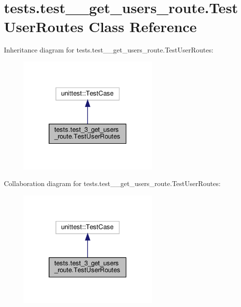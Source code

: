 \hypertarget{classtests_1_1test__3__get__users__route_1_1_test_user_routes}{}\section{tests.\+test\+\_\+\_\+get\+\_\+users\+\_\+route.\+Test\+User\+Routes Class Reference}
\label{classtests_1_1test__3__get__users__route_1_1_test_user_routes}


Inheritance diagram for tests.\+test\+\_\+\_\+get\+\_\+users\+\_\+route.\+Test\+User\+Routes\+:
\nopagebreak
\begin{figure}[H]
\begin{center}
\leavevmode
\includegraphics[width=199pt]{classtests_1_1test__3__get__users__route_1_1_test_user_routes__inherit__graph}
\end{center}
\end{figure}


Collaboration diagram for tests.\+test\+\_\+\_\+get\+\_\+users\+\_\+route.\+Test\+User\+Routes\+:
\nopagebreak
\begin{figure}[H]
\begin{center}
\leavevmode
\includegraphics[width=199pt]{classtests_1_1test__3__get__users__route_1_1_test_user_routes__coll__graph}
\end{center}
\end{figure}
